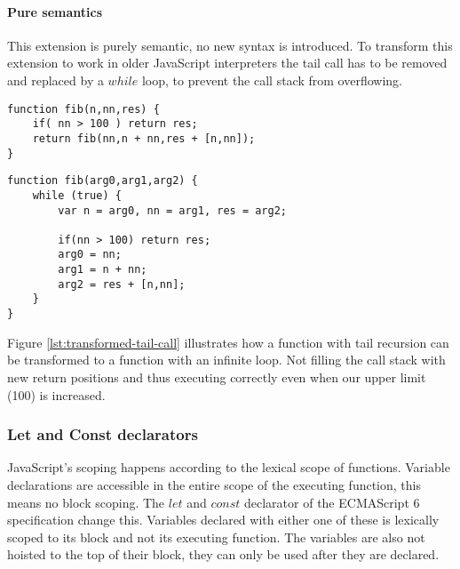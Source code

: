 \documentclass[10pt,a4paper]{article}
\begin{document}
\paragraph{Pure semantics}
This extension is purely semantic, no new syntax is introduced. To transform this extension to work in older JavaScript interpreters the tail call has to be removed and replaced by a $while$ loop, to prevent the call stack from overflowing.

\begin{lstlisting}[caption={Function with tail recursion},label={lst:tail-call}]
function fib(n,nn,res) {
	if( nn > 100 ) return res;
	return fib(nn,n + nn,res + [n,nn]);
}
\end{lstlisting}

\begin{lstlisting}[caption={Semantically identical function, without tail recursion},label={lst:transformed-tail-call}]
function fib(arg0,arg1,arg2) {
	while (true) {
		var n = arg0, nn = arg1, res = arg2;

		if(nn > 100) return res;
		arg0 = nn;
		arg1 = n + nn;
		arg2 = res + [n,nn];
	}
}
\end{lstlisting}

Figure \ref{lst:transformed-tail-call} illustrates how a function with tail recursion can be transformed to a function with an infinite loop. Not filling the call stack with new return positions and thus executing correctly even when our upper limit (100) is increased.

\subsubsection{Let and Const declarators}
JavaScript's scoping happens according to the lexical scope of functions. Variable declarations are accessible in the entire scope of the executing function, this means no block scoping. The $let$ and $const$ declarator of the ECMAScript 6 specification change this. Variables declared with either one of these is lexically scoped to its block and not its executing function. The variables are also not hoisted to the top of their block, they can only be used after they are declared.
\end{document}
